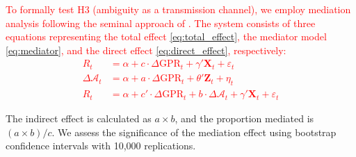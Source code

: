 \documentclass[preprint,12pt,authoryear]{elsarticle}
\begin{document}
\textcolor{red}{
To formally test H3 (ambiguity as a transmission channel), we employ mediation analysis following the seminal approach of \citet{Baron1986Moderator}. The system consists of three equations representing the total effect \eqref{eq:total_effect}, the mediator model \eqref{eq:mediator}, and the direct effect \eqref{eq:direct_effect}, respectively:
\begin{align}
    R_{t} &= \alpha + c \cdot \Delta \text{GPR}_{t} + \gamma' \mathbf{X}_{t} + \varepsilon_{t} \label{eq:total_effect} \\
    \Delta \mathcal{A}_{t} &= \alpha + a \cdot \Delta \text{GPR}_{t} + \theta' \mathbf{Z}_{t} + \eta_{t} \label{eq:mediator} \\
    R_{t} &= \alpha + c' \cdot \Delta \text{GPR}_{t} + b \cdot \Delta \mathcal{A}_{t} + \gamma' \mathbf{X}_{t} + \varepsilon_{t} \label{eq:direct_effect}
\end{align}
}

The indirect effect is calculated as $a \times b$, and the proportion mediated is $(a \times b) / c$. We assess the significance of the mediation effect using bootstrap confidence intervals with 10,000 replications.
\end{document}

